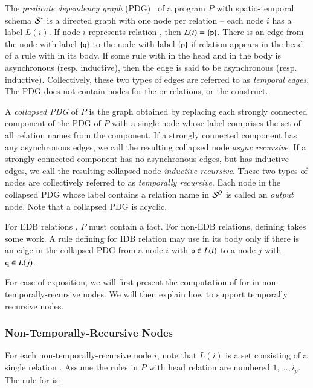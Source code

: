 The {\em predicate dependency graph} (PDG)~\cite{ullmanbook} of a \slang program $P$ with spatio-temporal schema $\stschema$ is a directed graph with one node per relation -- each node $i$ has a label $L(i)$.  If node $i$ represents relation , then $L(i) = \{\dedalus{p}\}$.  There is an edge from the node with label $\{\dedalus{q}\}$ to the node with label $\{\dedalus{p}\}$ if relation  appears in the head of a rule with  in its body.  If some rule with  in the head and  in the body is asynchronous (resp. inductive), then the edge is said to be asynchronous (resp. inductive).  Collectively, these two types of edges are referred to as {\em temporal edges}.  The PDG does not contain nodes for the  or  relations, or the  construct.

A {\em collapsed PDG} of $P$ is the graph obtained by replacing each strongly connected component of the PDG of $P$ with a single node whose label comprises the set of all relation names from the component.  If a strongly connected component has any asynchronous edges, we call the resulting collapsed node {\em async recursive}.  If a strongly connected component has no asynchronous edges, but has inductive edges, we call the resulting collapsed node {\em inductive recursive}.  These two types of nodes are collectively referred to as {\em temporally recursive}.  Each node in the collapsed PDG whose label contains a relation name in $\oschema$ is called an {\em output} node.  Note that a collapsed PDG is acyclic.

For EDB relations , $P$ must contain a  fact.  For non-EDB relations, defining  takes some work.  A rule defining  for IDB relation  may use  in its body only if there is an edge in the collapsed PDG from a node $i$ with $\dedalus{p} \in L(i)$ to a node $j$ with $\dedalus{q} \in L(j)$.

For ease of exposition, we will first present the computation of  for  in non-temporally-recursive nodes.  We will then explain how to support temporally recursive nodes.

\subsubsection{Non-Temporally-Recursive Nodes}

For each non-temporally-recursive node $i$, note that $L(i)$ is a set consisting of a single relation .  Assume the rules in $P$ with head relation  are numbered $1, \ldots, i_p$.  The rule for  is:

